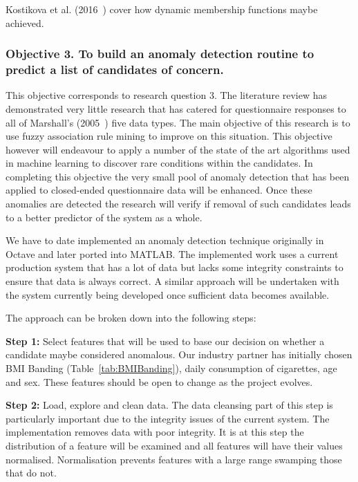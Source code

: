 Kostikova et al. (2016~\cite{kostikova2016expert}) cover how dynamic membership functions maybe achieved.


\subsubsection{Objective 3. To build an anomaly detection routine to predict a list of candidates of concern.}

This objective corresponds to research question 3. The literature review has demonstrated very little research that has catered for questionnaire responses to all of Marshall's (2005~\cite{marshall2005purpose}) five data types. The main objective of this research is to use fuzzy association rule mining to improve on this situation. This objective however will endeavour to apply a number of the state of the art algorithms used in machine learning to discover rare conditions within the candidates. In completing this objective the very small pool of anomaly detection that has been applied to closed-ended questionnaire data will be enhanced. Once these anomalies are detected the research will verify if removal of such candidates leads to a better predictor of the system as a whole.


We have to date implemented an anomaly detection technique originally in Octave and later ported into MATLAB. The implemented work uses a current production system that has a lot of data but lacks some integrity constraints to ensure that data is always correct.
A similar approach will be undertaken with the system currently being developed once sufficient data becomes available.

\par
\noindent
The approach can be broken down into the following steps:

\textbf{Step 1:} Select features that will be used to base our decision on whether a candidate maybe considered anomalous. Our industry partner has initially chosen BMI Banding (Table~\ref{tab:BMIBanding}), daily consumption of cigarettes, age and sex. These features should be open to change as the project evolves.



\textbf{Step 2:} Load, explore and clean data. The data cleansing part of this step is particularly important due to the integrity issues of the current system. The implementation removes data with poor integrity. It is at this step the distribution of a feature will be examined and all features will have their values normalised. Normalisation prevents features with a large range swamping those that do not.

